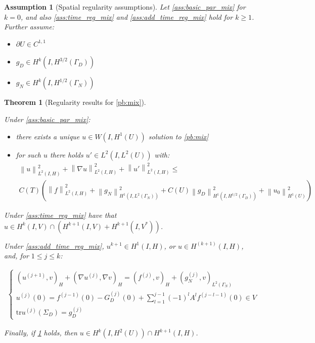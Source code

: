 \documentclass[english,a4paper,10pt,oneside]{scrbook}	%
\theoremstyle{break}
\newtheorem{thm}[equation]{Theorem}
\newtheorem{ass}[equation]{Assumption}
\theoremstyle{remark}
\newcommand{\norm}[1]{\left\lVert#1\right\rVert}
\newcommand{\tr}{\text{tr}}
\begin{document}
\begin{ass}[Spatial regularity assumptions]
\label{ass:space_reg_mix}
Let \cref{ass:basic_par_mix} for $k=0$, and also \cref{ass:time_reg_mix} and \cref{ass:add_time_reg_mix} hold for $k\geq 1$. Further assume:

\begin{itemize}
	\item $\partial U \in C^{1,1}$
	\item $g_D \in H^k(I,H^{3/2}(\Gamma_D))$
	\item $g_N \in H^k(I,H^{1/2}(\Gamma_N))$
\end{itemize}

\end{ass}


\begin{thm}[Regularity results for \cref{pb:mix}]
\label{thm:mix_reg}

Under \cref{ass:basic_par_mix}:

\begin{itemize}
	\item there exists a unique $u \in W(I,H^1(U))$ solution to \cref{pb:mix}
	\item for such $u$ there holds $u' \in L^2(I,L^2(U))$ with:
	\begin{align*}
	\norm{u}^2_{L^2(I,H)}+\norm{\nabla u}^2_{L^2(I,H)} + \norm{u'}^2_{L^2(I,H)} \leq \\
	C(T)\left (  \norm{f}_{L^2(I,H)}^2 +  \norm{g_N}^2_{H^1(I,L^2(\Gamma_N))}   + C(U) \norm{g_D}^2_{H^1(I,H^{1/2}(\Gamma_D))} + \norm{u_0}^2_{H^1(U)}\right )
\end{align*}
\end{itemize}

Under \cref{ass:time_reg_mix} have that $u \in H^k(I,V)\cap ( H^{k+1}(I,V) + H^{k+1}(I,V^*))$.


Under \cref{ass:add_time_reg_mix}, $u^{k+1} \in H^1(I,H)$, or $u \in H^{(k+1)}(I,H)$, and, for $1\leq j \leq k$:

\begin{align*}
	\left\{\begin{matrix}
(u^{(j+1)},v)_H + (\nabla u^{(j)}, \nabla v)_H = ( f^{(j)}, v)_H + (g_N^{(j)}, v)_{L^2(\Gamma_N)} \\
u^{(j)}(0) = f^{(j-1)}(0) - G_D^{(j)}(0) + \sum_{l=1}^{j-1}(-1)^l A^l f^{(j-l-1)}(0)   \in V \\
\tr u^{(j)}(\Sigma_D) = g_D^{(j)}
\end{matrix}\right.
\end{align*}


Finally, if \cref{ass:space_reg_mix} holds, then $u \in H^{k}(I,H^2(U)) \cap H^{k+1}(I,H)$.

\end{thm}
\end{document}
